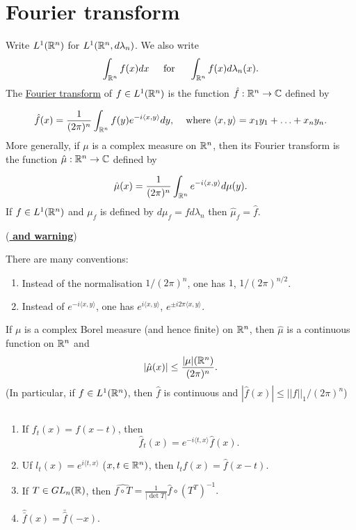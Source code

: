 
\section{Fourier transform}
Write $L^1(\mathbb{R}^n)$ for $L^1(\mathbb{R}^n,d\lambda_n)$. We also write \[\int_{\mathbb{R}^n}f(x)dx\hspace{4mm}\text{ for }\hspace{4mm}\int_{\mathbb{R}^n}f(x)d\lambda_n(x).\]
The \underline{Fourier transform} of $f\in L^1(\mathbb{R}^n)$ is the function $\hat f:\mathbb{R}^n\rightarrow \mathbb{C}$ defined by 

\[\hat f(x) = \frac{1}{(2\pi)^n}\int_{\mathbb{R}^n} f(y)e^{-i\langle x,y\rangle}dy,\hspace{4mm}\text{where } \langle x,y\rangle = x_1y_1+\ldots + x_ny_n.\]
More generally, if $\mu$ is a complex measure on $\mathbb{R}^n$, then its Fourier transform is the function $\hat\mu:\mathbb{R}^n\rightarrow\mathbb{C}$ defined by 

\[\hat\mu(x)=\frac{1}{(2\pi)^n}\int_{\mathbb{R}^n}e^{-i\langle x,y\rangle}d\mu(y).\]
If $f\in L^1(\mathbb{R}^n)$ and $\mu_f$ is defined by $d\mu_f = fd\lambda_n$ then $\hat{\mu}_f=\hat f$.

\begin{remark}(\underline{\textbf{ and warning}})
    
    There are many conventions:
    \begin{enumerate}
        \item Instead of the normalisation $1/(2\pi)^n$, one has $1$, $1/(2\pi)^{n/2}$.
        \item Instead of $e^{-i\langle x,y\rangle}$, one has $e^{i\langle x,y\rangle}$, $e^{\pm i2\pi\langle x,y\rangle}$.
    \end{enumerate}
\end{remark}

\begin{lemma}
    If $\mu$ is a complex Borel measure (and hence finite) on $\mathbb{R}^n$, then $\hat\mu$ is a continuous function on $\mathbb{R}^n$ and \[|\hat\mu(x)|\leq \frac{|\mu|(\mathbb{R}^n)}{(2\pi)^n}.\]
    (In particular, if $f\in L^1(\mathbb{R}^n)$, then $\hat f$ is continuous and $|\hat f (x)|\leq ||f||_1/(2\pi)^n$)
\end{lemma}

\begin{lemma}
    $\quad$
    \begin{enumerate}
        \item If $f_t(x) = f(x-t)$, then \[\hat f_t(x) = e^{-i\langle t,x\rangle}\hat f(x).\] 
        \item Uf $l_t(x)=e^{i\langle t,x\rangle}$ ($x,t\in\mathbb{R}^n)$, then $\hat{l_t f}(x)=\hat f(x-t)$.
        \item If $T\in GL_n(\mathbb{R})$, then $\hat{f\circ T}=\frac{1}{|\det T|}\hat f\circ (T^T)^{-1}.$
        \item $\hat{\bar{f}}(x)=\bar{\hat{f}}(-x).$
    \end{enumerate}
\end{lemma}

